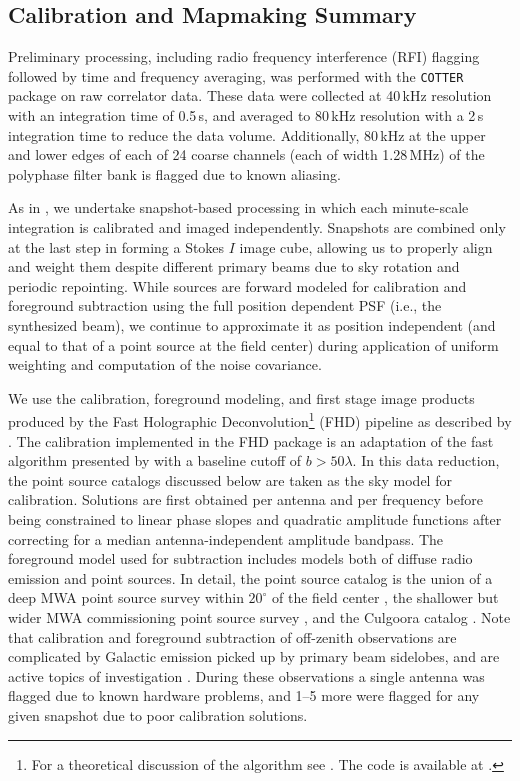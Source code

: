 
\subsection{Calibration and Mapmaking Summary} \label{sec:processing}

Preliminary processing, including radio frequency interference (RFI) flagging followed by time and frequency averaging, was performed with the \texttt{COTTER} package \cite{AndreMWARFI} on raw correlator data. These data were collected at 40\,kHz resolution with an integration time of 0.5\,s, and averaged to 80\,kHz resolution with a 2\,s integration time to reduce the data volume. Additionally, 80\,kHz at the upper and lower edges of each of 24 coarse channels (each of width 1.28\,MHz) of the polyphase filter bank is flagged due to known aliasing.

As in \cite{X13}, we undertake snapshot-based processing in which each minute-scale integration is calibrated and imaged independently. Snapshots are combined only at the last step in forming a Stokes $I$ image cube, allowing us to properly align and weight them despite different primary beams due to sky rotation and periodic repointing. 
While sources are forward modeled for calibration and foreground subtraction using the full position dependent PSF (i.e., the synthesized beam), we continue to approximate it as position independent (and equal to that of a point source at the field center) during application of uniform weighting and computation of the noise covariance. 

We use the calibration, foreground modeling, and first stage image products produced by the Fast Holographic Deconvolution\footnote{For a theoretical discussion of the algorithm see \cite{fhd}. The code is available at .} (FHD) pipeline as described by \cite{JacobsPipelines}. The calibration implemented in the FHD package is an adaptation of the fast algorithm presented by \cite{Salvini2014} with a baseline cutoff of $b>50\lambda$. In this data reduction, the point source catalogs discussed below are taken as the sky model for calibration.  Solutions are first obtained per antenna and per frequency before being constrained to linear phase slopes and quadratic amplitude functions after correcting for a median antenna-independent amplitude bandpass.  The foreground model used for subtraction includes models both of diffuse radio emission \cite{AdamDiffuse} and point sources. In detail, the point source catalog is the union of a deep MWA point source survey within $20^\circ$ of the field center \cite{PattiCatalog1}, the shallower but wider MWA commissioning point source survey \cite{MWACS}, and the Culgoora catalog \cite{Slee1995}. Note that calibration and foreground subtraction of off-zenith observations are complicated by Galactic emission picked up by primary beam sidelobes, and are active topics of investigation \cite{pober16,nithya15,nithya15b}. During these observations a single antenna was flagged due to known hardware problems, and 1--5 more were flagged for any given snapshot due to poor calibration solutions.

